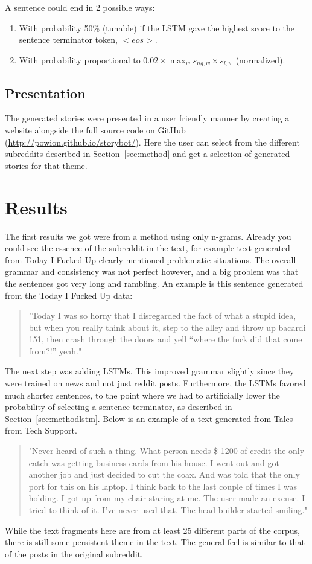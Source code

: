 \documentclass[12pt,a4paper,utf8]{article}
\begin{document}
A sentence could end in 2 possible ways:
\begin{enumerate}
\item With probability 50\% (tunable) if the LSTM gave the highest score to the sentence terminator token, $<eos>$.
\item With probability proportional to $0.02 \times \max_w{s_{ng,w}} \times s_{l,w}$ (normalized).
\end{enumerate}

\subsection{Presentation}
The generated stories were presented in a user friendly manner by creating a website alongside the full source code on GitHub (\url{http://powion.github.io/storybot/}). Here the user can select from the different subreddits described in Section~\ref{sec:method} and get a selection of generated stories for that theme.

\section{Results}
The first results we got were from a method using only n-grams. Already you could see the essence of the subreddit in the text, for example text generated from Today I Fucked Up clearly mentioned problematic situations. The overall grammar and consistency was not perfect however, and a big problem was that the sentences got very long and rambling. An example is this sentence generated from the Today I Fucked Up data:
\begin{quotation}
"Today I was so horny that I disregarded the fact of what a stupid idea, but when you really think about it, step to the alley and throw up bacardi 151, then crash through the doors and yell ``where the fuck did that come from?!'' yeah."
\end{quotation}
The next step was adding LSTMs. This improved grammar slightly since they were trained on news and not just reddit posts. Furthermore, the LSTMs favored much shorter sentences, to the point where we had to artificially lower the probability of selecting a sentence terminator, as described in Section~\ref{sec:methodlstm}. Below is an example of a text generated from Tales from Tech Support. 
\begin{quotation}
"Never heard of such a thing. What person needs \$ 1200 of credit the only catch was getting business cards from his house. I went out and got another job and just decided to cut the coax. And was told that the only port for this on his laptop. I think back to the last couple of times I was holding. I got up from my chair staring at me. The user made an excuse. I tried to think of it. I've never used that. The head builder started smiling."
\end{quotation}
While the text fragments here are from at least 25 different parts of the corpus, there is still some persistent theme in the text. The general feel is similar to that of the posts in the original subreddit. 
\end{document}
